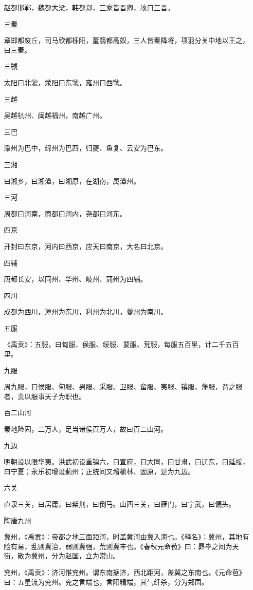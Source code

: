 \documentclass[a4paper,12pt,UTF8,twoside]{ctexbook}
\begin{document}
	赵都邯郸，魏都大梁，韩都郑，三家皆晋卿，故曰三晋。
	
	三秦
	
	章邯都废丘，司马欣都栎阳，董翳都高奴，三人皆秦降将，项羽分关中地以王之，曰三秦。
	
	三虢
	
	太阳曰北虢，荥阳曰东虢，雍州曰西虢。
	
	三越
	
	吴越杭州、闽越福州，南越广州。
	
	三巴
	
	渝州为巴中，绵州为巴西，归夔、鱼复、云安为巴东。
	
	三湘
	
	曰湘乡，曰湘潭，曰湘原，在湖南，属潭州。
	
	三河
	
	周都曰河南，商都曰河内，尧都曰河东。
	
	四京
	
	开封曰东京，河内曰西京，应天曰南京，大名曰北京。
	
	四辅
	
	唐都长安，以同州、华州、岐州、蒲州为四辅。
	
	四川
	
	成都为西川，潼州为东川，利州为北川，夔州为南川。
	
	五服
	
	《禹贡》：五服，曰甸服、侯服、绥服、要服、荒服，每服五百里，计二千五百里。
	
	九服
	
	周九服，曰侯服、甸服、男服、采服、卫服、蛮服、夷服、镇服、藩服，谓之服者，责以服事天子为职也。
	
	百二山河
	
	秦地险固，二万人，足当诸侯百万人，故曰百二山河。
	
	九边
	
	明朝设以限华夷。洪武初设重镇六，曰宣府，曰大同，曰甘肃，曰辽东，曰延绥，曰宁夏；永乐初增设蓟州；正统间又增榆林、固原，是为九边。
	
	六关
	
	直隶三关，曰居庸，曰紫荆，曰倒马。山西三关，曰雁门，曰宁武，曰偏头。
	
	陶唐九州
	
	冀州，《禹贡》：帝都之地三面距河，时盖黄河由冀入海也。《释名》：冀州，其地有险有易，乱则冀治，弱则冀强，荒则冀丰也。《春秋元命苞》曰：昴毕之间为天街，散为冀州，分为赵国，立为常山。
	
	兖州，《禹贡》：济河惟兖州。谓东南据济，西北距河，盖冀之东南也。《元命苞》曰：五星流为兖州。兖之言端也，言阳精端，其气纤杀，分为郑国。
	
\end{document}
